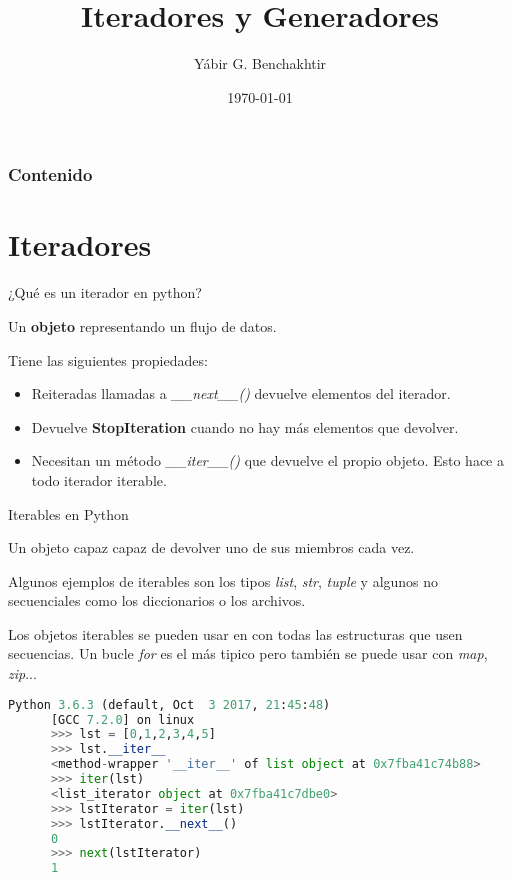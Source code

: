 \documentclass[spanish]{beamer}
\title{Iteradores y Generadores}
\date{\today}
\author{Yábir G. Benchakhtir}
\institute{LibreIM}
\begin{document}
  \maketitle

  \begin{frame}\frametitle{Contenido}
    \tableofcontents
  \end{frame} 
  \section{Iteradores}
  \begin{frame}{¿Qué es un iterador en python?}
    \begin{definition}
      Un \textbf{objeto} representando un flujo de datos.
    \end{definition}

    Tiene las siguientes propiedades:

    \begin{itemize}
    \item Reiteradas llamadas a \textit{\_\_next\_\_()} devuelve elementos del iterador.
    \item Devuelve \textbf{StopIteration} cuando no hay más elementos que devolver.
    \item Necesitan un método \textit{\_\_iter\_\_()} que devuelve el
      propio objeto. Esto hace a todo iterador iterable.
    \end{itemize}
  \end{frame}

  \begin{frame}{Iterables en Python}
    \begin{definition}
      Un objeto capaz capaz de devolver uno de sus miembros cada vez.
    \end{definition}

    Algunos ejemplos de iterables son los tipos \textit{list},
    \textit{str}, \textit{tuple} y algunos no secuenciales como los
    diccionarios o los archivos.
  \end{frame}

  \begin{frame}
    Los objetos iterables se pueden usar en con todas las estructuras
    que usen secuencias. Un bucle \textit{for} es el más tipico pero
    también se puede usar con \textit{map}, \textit{zip}...
  \end{frame}

  \begin{frame}[fragile]
    
    \begin{lstlisting}[language=Python,keywordstyle=\bf,stringstyle=\it]
      Python 3.6.3 (default, Oct  3 2017, 21:45:48) 
      [GCC 7.2.0] on linux
      >>> lst = [0,1,2,3,4,5]
      >>> lst.__iter__
      <method-wrapper '__iter__' of list object at 0x7fba41c74b88>
      >>> iter(lst)
      <list_iterator object at 0x7fba41c7dbe0>
      >>> lstIterator = iter(lst)
      >>> lstIterator.__next__()
      0
      >>> next(lstIterator)
      1
      
    \end{lstlisting}
    
  \end{frame}
\end{document}
